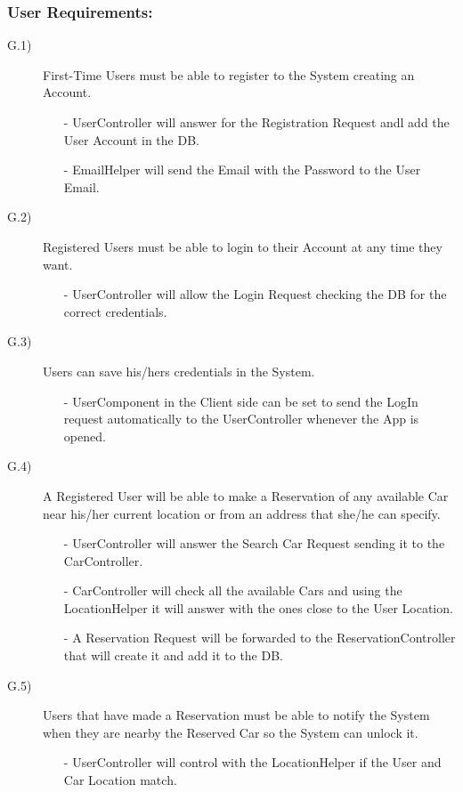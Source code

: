 \documentclass[a4paper]{article}
\begin{document}
\subsubsection{\textbf{User Requirements:}}
\begin{description}
\item [G.1)]First-Time Users must be able to register to the System creating an Account. 
\begin{itemize}
	\item[-]UserController will answer for the Registration Request andl add the User Account in the DB.
	\item[-]EmailHelper will send the Email with the Password to the User Email.
\end{itemize}
\item [G.2)]Registered Users must be able to login to their Account at any time they want.
\begin{itemize}
	\item[-]UserController will allow the Login Request checking the DB for the correct credentials.
\end{itemize}
\item [G.3)]Users can save his/hers credentials in the System.
\begin{itemize}
	\item[-]UserComponent in the Client side can be set to send the LogIn request automatically to the UserController whenever the App is opened.
\end{itemize}
\item [G.4)]A Registered User will be able to make a Reservation of any available Car near his/her current location or from an address that she/he can specify.
\begin{itemize}
	\item[-]UserController will answer the Search Car Request sending it to the CarController.
	\item[-]CarController will check all the available Cars and using the LocationHelper it will answer with the ones close to the User Location.
	\item[-]A Reservation Request will be forwarded to the ReservationController that will create it and add it to the DB.
\end{itemize}
\item [G.5)]Users that have made a Reservation must be able to notify the System when they are nearby the Reserved Car so the System can unlock it.
\begin{itemize}
	\item[-]UserController will control with the LocationHelper if the User and Car Location match.

\end{itemize}
\end{description}
\end{document}
